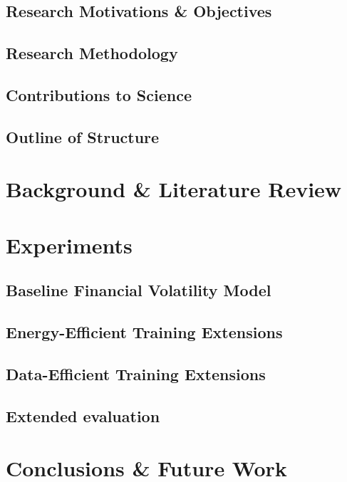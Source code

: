 \documentclass[a4paper, 12pt]{report}
\begin{document}
    \section{Research Motivations \& Objectives}
    \label{section: motivations}

    \section{Research Methodology}
    \label{section: method}

    \section{Contributions to Science}
    \label{section: contributions}

    \section{Outline of Structure}
    \label{section: structure}


    \newpage
    \chapter{Background \& Literature Review}
    \label{chapter: literature}


    \newpage
    \chapter{Experiments}
    \label{chapter: experiments}

    \section{Baseline Financial Volatility Model}
    \label{section: baseline}

    \section{Energy-Efficient Training Extensions}
    \label{section: energy-extensions}

    \section{Data-Efficient Training Extensions}
    \label{section: data-extensions}

    \section{Extended evaluation}
    \label{section: evaluation}


    \newpage
    \chapter{Conclusions \& Future Work}
    \label{chapter: conclusion}


    \newpage
    
\end{document}
